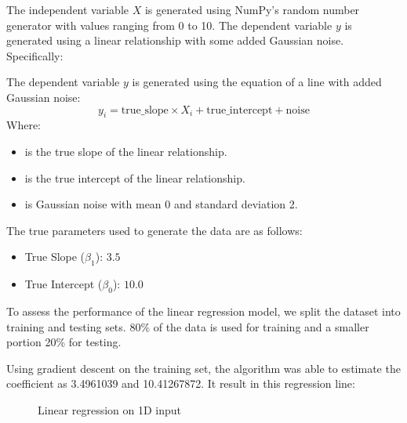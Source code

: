 \documentclass{article}
\begin{document}
The independent variable \( X \) is generated using NumPy's random number generator with values ranging from 0 to 10. The dependent variable \( y \) is generated using a linear relationship with some added Gaussian noise. Specifically:

The dependent variable \( y \) is generated using the equation of a line with added Gaussian noise:
\[
y_i = \text{{true\_slope}} \times X_i + \text{{true\_intercept}} + \text{{noise}}
\]
Where:
\begin{itemize}
    \item {} is the true slope of the linear relationship.
    \item {} is the true intercept of the linear relationship.
    \item {} is Gaussian noise with mean 0 and standard deviation 2.
\end{itemize}

The true parameters used to generate the data are as follows:
\begin{itemize}
    \item True Slope (\( \beta_1 \)): \( 3.5 \)
    \item True Intercept (\( \beta_0 \)): \( 10.0 \)
\end{itemize}

To assess the performance of the linear regression model, we split the dataset into training and testing sets. 80\% of the data is used for training and a smaller portion 20\% for testing.

Using gradient descent on the training set, the algorithm was able to estimate the coefficient as 3.4961039 and 10.41267872. It result in this regression line:

\begin{figure}[H]
    \centering
    \caption{Linear regression on 1D input}
    \label{fig:example}
\end{figure}
\end{document}
